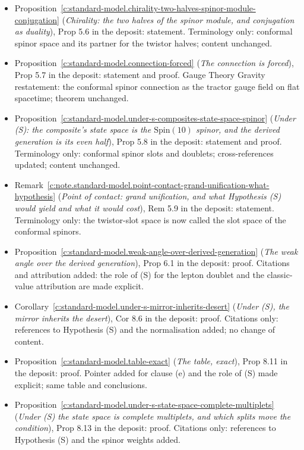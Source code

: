 \documentclass[11pt]{article}
\theoremstyle{definition}
\theoremstyle{plain}
\begin{document}
\begin{itemize}
\item Proposition~\ref{c:standard-model.chirality-two-halves-spinor-module-conjugation} (\emph{Chirality: the two halves of the spinor module, and conjugation as duality}), Prop 5.6 in the deposit: statement. Terminology only: conformal spinor space and its partner for the twistor halves; content unchanged.
\item Proposition~\ref{c:standard-model.connection-forced} (\emph{The connection is forced}), Prop 5.7 in the deposit: statement and proof. Gauge Theory Gravity restatement: the conformal spinor connection as the tractor gauge field on flat spacetime; theorem unchanged.
\item Proposition~\ref{c:standard-model.under-s-composites-state-space-spinor} (\emph{Under (S): the composite's state space is the $\mathrm{Spin}(10)$ spinor, and the derived generation is its even half}), Prop 5.8 in the deposit: statement and proof. Terminology only: conformal spinor slots and doublets; cross-references updated; content unchanged.
\item Remark~\ref{c:note.standard-model.point-contact-grand-unification-what-hypothesis} (\emph{Point of contact: grand unification, and what Hypothesis (S) would yield and what it would cost}), Rem 5.9 in the deposit: statement. Terminology only: the twistor-slot space is now called the slot space of the conformal spinors.
\item Proposition~\ref{c:standard-model.weak-angle-over-derived-generation} (\emph{The weak angle over the derived generation}), Prop 6.1 in the deposit: proof. Citations and attribution added: the role of (S) for the lepton doublet and the classic-value attribution are made explicit.
\item Corollary~\ref{c:standard-model.under-s-mirror-inherits-desert} (\emph{Under (S), the mirror inherits the desert}), Cor 8.6 in the deposit: proof. Citations only: references to Hypothesis (S) and the normalisation added; no change of content.
\item Proposition~\ref{c:standard-model.table-exact} (\emph{The table, exact}), Prop 8.11 in the deposit: proof. Pointer added for clause (e) and the role of (S) made explicit; same table and conclusions.
\item Proposition~\ref{c:standard-model.under-s-state-space-complete-multiplets} (\emph{Under (S) the state space is complete multiplets, and which splits move the condition}), Prop 8.13 in the deposit: proof. Citations only: references to Hypothesis (S) and the spinor weights added.

\end{itemize}
\end{document}
